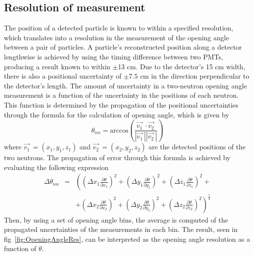 \subsection{Resolution of measurement}
The position of a detected particle is known to within a specified resolution, which translates into a resolution in the measurement of the opening angle between a pair of particles.
A particle's reconstructed position along a detector lengthwise is achieved by using the timing difference between two PMTs, producing a result known to within $\pm$13 cm.
Due to the detector's 15 cm width, there is also a positional uncertainty of $\pm 7.5$ cm in the direction perpendicular to the detector's length.
The amount of uncertainty in a two-neutron opening angle measurement is a function of the uncertainty in the positions of each neutron.
This function is determined by the propagation of the positional uncertainties through the formula for the calculation of opening angle, which is given by
\begin{displaymath}
    \theta_{nn} = \text{arccos}\left(\frac{\vec{v_{1}}^{\,}\cdot\vec{v_{2}}^{\,}}{|\vec{v_{1}}^{\,}||\vec{v_{2}}^{\,}|}\right)
\end{displaymath}
where $\vec{v_{1}}^{\,} = (x_1,y_1,z_1)$ and $\vec{v_{2}}^{\,} = (x_2,y_2,z_2)$ are the detected positions of the two neutrons.
The propagation of error through this formula is achieved by evaluating the following expression
\begin{eqnarray*}
 \Delta \theta_{nn} & = & \left( \left(\Delta x_1 \frac{\partial \theta}{\partial x_1}\right)^{2} + \left(\Delta y_1 \frac{\partial \theta}{\partial y_1}\right)^{2} + \left(\Delta z_1 \frac{\partial \theta}{\partial z_1}\right)^{2} + \right. \\
 & & \left. + \left(\Delta x_2 \frac{\partial \theta}{\partial x_2}\right)^{2} + \left(\Delta y_2\frac{\partial \theta}{\partial y_2}\right)^{2} + \left(\Delta z_2 \frac{\partial \theta}{\partial z_2}\right)^{2} \right) ^{\frac{1}{2}}
\end{eqnarray*}
Then, by using a set of opening angle bins, the average is computed of the propagated uncertainties of the measurements in each bin.
The result, seen in fig~\ref{fig:OpeningAngleRes}, can be interpreted as the opening angle resolution as a function of $\theta$.
